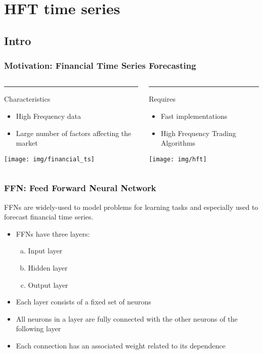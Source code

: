 \section{HFT time series}
\subsection{Intro}

\begin{frame}
\frametitle{Motivation: Financial Time Series Forecasting}
\begin{columns}
\begin{column}{.48\textwidth}
\color{purple}\rule{\linewidth}{4pt}
Characteristics
  \begin{itemize}
  \item High Frequency data
  \item Large number of factors affecting the market
  \end{itemize}
    \begin{center}
    \texttt{[image: img/financial\_ts]}
    \end{center}
\end{column}%
\begin{column}{.48\textwidth}
\color{blue}\rule{\linewidth}{4pt}
Requires
  \begin{itemize}
  \item Fast implementations
  \item High Frequency Trading Algorithms 
  \end{itemize}
    \begin{center}
    \texttt{[image: img/hft]}
    \end{center}
\end{column}
\end{columns}

\end{frame}

\begin{frame}
\frametitle{FFN: Feed Forward Neural Network}
 
FFNs are widely-used to model problems for learning tasks and especially
used to forecast financial time series.

\begin{itemize}
\item FFNs have three layers: 
\begin{enumerate}[a)]
\item Input layer
\item Hidden layer
\item Output layer
\end{enumerate}
\item Each layer consists of a fixed set of neurons
\item All neurons in a layer are fully connected with the other neurons
of the following layer
\item Each connection has an associated weight related to its
dependence
\end{itemize}

\end{frame}


